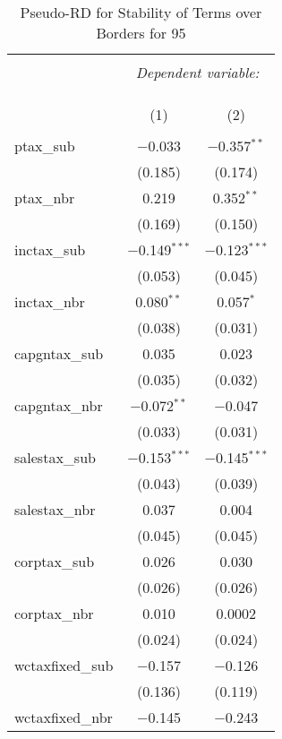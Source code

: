 
\begin{table}[!htbp] \centering 
  \caption{Pseudo-RD for Stability of Terms over Borders for  95} 
  \label{} 
\begin{tabular}{@{\extracolsep{5pt}}lcc} 
\\[-1.8ex]\hline 
\hline \\[-1.8ex] 
 & \multicolumn{2}{c}{\textit{Dependent variable:}} \\ 
\cline{2-3} 
\\[-1.8ex] & \multicolumn{2}{c}{ } \\ 
\\[-1.8ex] & (1) & (2)\\ 
\hline \\[-1.8ex] 
 ptax\_sub & $-$0.033 & $-$0.357$^{**}$ \\ 
  & (0.185) & (0.174) \\ 
  ptax\_nbr & 0.219 & 0.352$^{**}$ \\ 
  & (0.169) & (0.150) \\ 
  inctax\_sub & $-$0.149$^{***}$ & $-$0.123$^{***}$ \\ 
  & (0.053) & (0.045) \\ 
  inctax\_nbr & 0.080$^{**}$ & 0.057$^{*}$ \\ 
  & (0.038) & (0.031) \\ 
  capgntax\_sub & 0.035 & 0.023 \\ 
  & (0.035) & (0.032) \\ 
  capgntax\_nbr & $-$0.072$^{**}$ & $-$0.047 \\ 
  & (0.033) & (0.031) \\ 
  salestax\_sub & $-$0.153$^{***}$ & $-$0.145$^{***}$ \\ 
  & (0.043) & (0.039) \\ 
  salestax\_nbr & 0.037 & 0.004 \\ 
  & (0.045) & (0.045) \\ 
  corptax\_sub & 0.026 & 0.030 \\ 
  & (0.026) & (0.026) \\ 
  corptax\_nbr & 0.010 & 0.0002 \\ 
  & (0.024) & (0.024) \\ 
  wctaxfixed\_sub & $-$0.157 & $-$0.126 \\ 
  & (0.136) & (0.119) \\ 
  wctaxfixed\_nbr & $-$0.145 & $-$0.243 \\ 

\end{tabular}
\end{table}
